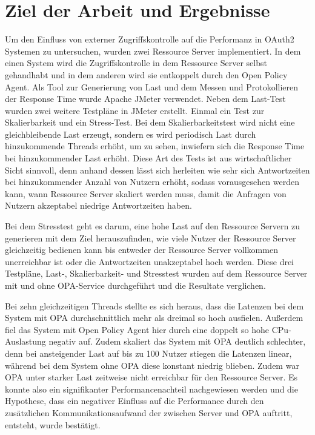 \section{Ziel der Arbeit und Ergebnisse}
\label{sec:intro:goal}
Um den Einfluss von externer Zugriffskontrolle auf die Performanz in OAuth2 Systemen zu untersuchen, wurden zwei Ressource Server implementiert. In dem einen System wird die Zugriffskontrolle in dem Ressource Server selbst gehandhabt und in dem anderen wird sie entkoppelt durch den Open Policy Agent. 
Als Tool zur Generierung von Last und dem Messen und Protokollieren der Response Time wurde Apache JMeter verwendet. Neben dem Last-Test wurden zwei weitere Testpläne in JMeter erstellt. Einmal ein Test zur Skalierbarkeit und ein Stress-Test. Bei dem Skalierbarkeitstest wird nicht eine gleichbleibende Last erzeugt, sondern es wird periodisch Last durch hinzukommende Threads erhöht, um zu sehen, inwiefern sich die Response Time bei hinzukommender Last erhöht. Diese Art des Tests ist aus wirtschaftlicher Sicht sinnvoll, denn anhand dessen lässt sich herleiten wie sehr sich Antwortzeiten bei hinzukommender Anzahl von Nutzern erhöht, sodass vorausgesehen werden kann, wann Ressource Server skaliert werden muss, damit die Anfragen von Nutzern akzeptabel niedrige Antwortzeiten haben. \smallskip

Bei dem Stresstest geht es darum, eine hohe Last auf den Ressource Servern zu generieren mit dem Ziel herauszufinden, wie viele Nutzer der Ressource Server gleichzeitig bedienen kann bis entweder der Ressource Server vollkommen unerreichbar ist oder die Antwortzeiten unakzeptabel hoch werden. Diese drei Testpläne, Last-, Skalierbarkeit- und Stresstest wurden auf dem Ressource Server mit und ohne OPA-Service durchgeführt und die Resultate verglichen.\smallskip

Bei zehn gleichzeitigen Threads stellte es sich heraus, dass die Latenzen bei dem System mit OPA durchschnittlich mehr als dreimal so hoch ausfielen. Außerdem fiel das System mit Open Policy Agent hier durch eine doppelt so hohe CPu-Auslastung negativ auf. Zudem skaliert das System mit \ac*{OPA} deutlich schlechter, denn bei ansteigender Last auf bis zu 100 Nutzer stiegen die Latenzen linear, während bei dem System ohne OPA diese konstant niedrig blieben. Zudem war \ac*{OPA} unter starker Last zeitweise nicht erreichbar für den Ressource Server. Es konnte also ein signifikanter Performancenachteil nachgewiesen werden und die Hypothese, dass ein negativer Einfluss auf die Performance durch den zusätzlichen Kommunikationsaufwand der zwischen Server und \ac*{OPA} auftritt, entsteht, wurde bestätigt.

